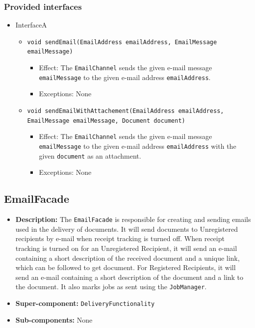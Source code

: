 \documentclass[a4paper,10pt]{article}
\begin{document}
\subsubsection*{Provided interfaces}
\begin{itemize}
    \item InterfaceA
    \begin{itemize}
        \item \texttt{void sendEmail(EmailAddress emailAddress, EmailMessage emailMessage)}
        \begin{itemize}
            \item Effect: The \texttt{EmailChannel} sends the given e-mail message \texttt{emailMessage} to the given e-mail address \texttt{emailAddress}.
            \item Exceptions: None
		\end{itemize}


        \item \texttt{void sendEmailWithAttachement(EmailAddress emailAddress, EmailMessage emailMessage, Document document)}
        \begin{itemize}
            \item Effect: The \texttt{EmailChannel} sends the given e-mail message \texttt{emailMessage} to the given e-mail address \texttt{emailAddress} with the given \texttt{document} as an attachment.
            \item Exceptions: None
		\end{itemize}
    \end{itemize}
\end{itemize}

\subsection{EmailFacade}
\begin{itemize}
    \item \textbf{Description:} The \texttt{EmailFacade} is responsible for creating and sending emails used in the delivery of documents. It will send documents to  Unregistered recipients by e-mail when receipt tracking is turned off. When receipt tracking is turned on for an Unregistered Recipient, it will send an e-mail containing a short description of the received document and a unique link, which can be followed to get document. For Registered Recipients, it will send an e-mail containing a short description of the document and a link to the document. It also marks jobs as sent using the \texttt{JobManager}.
    \item \textbf{Super-component:} \texttt{DeliveryFunctionality}
    \item \textbf{Sub-components:} None
\end{itemize}
\end{document}
